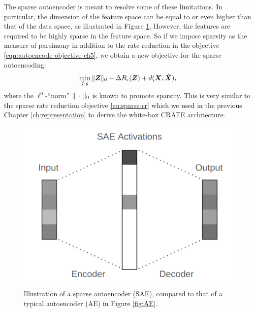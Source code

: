 \documentclass[../../book-main.tex]{subfiles}
\begin{document}
The sparse autoencoder is meant to resolve some of these limitations. In
particular, the dimension of the feature space can be equal to or
even higher than that of the data space, as illustrated in Figure
\ref{fig:SAE}. However, the features are required to be highly
sparse in the feature space. So if we impose sparsity as the measure
of parsimony in addition to the rate reduction in the objective
\eqref{eqn:autoencode-objective-ch5}, we obtain a new objective for
the sparse autoencoding:
\begin{equation}
  \min_{f, g}
  \|\bm{Z}\|_0 - \Delta R_{\epsilon}(\bm{Z}) + d(\bm{X}, \hat {\bm{X}}),
  \label{eqn:autoencode-sparse}
\end{equation}
where the $\ell^0$-``norm'' $\|\,\cdot\,\|_0$ is known to promote sparsity.
This is very similar to the sparse rate reduction objective
\eqref{eq:sparse-rr} which we used in the previous Chapter \ref{ch:representation} to derive the white-box CRATE architecture.

\begin{figure}
  \centering
  \includegraphics[width=0.5\linewidth]{chapters/chapter5/figs/SAE_diagram.png}
  \caption{Illustration of a sparse autoencoder (SAE), compared to
  that of a typical autoencoder (AE) in Figure \ref{fig:AE}. }
  \label{fig:SAE}
\end{figure}

\end{document}
